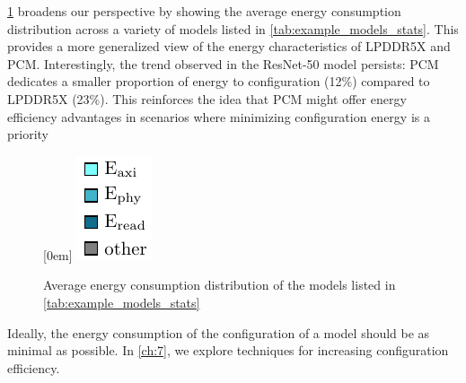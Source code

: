 
\cref{fig:example_models_avg_conf_proc} broadens our perspective by showing the average energy consumption distribution across a variety of models listed in \cref{tab:example_models_stats}.
This provides a more generalized view of the energy characteristics of LPDDR5X and PCM.
Interestingly, the trend observed in the ResNet-50 model persists: PCM dedicates a smaller proportion of energy to configuration (12\%) compared to LPDDR5X (23\%).
This reinforces the idea that PCM might offer energy efficiency advantages in scenarios where minimizing configuration energy is a priority

\begin{figure}[hbtp]
    \centering
    \hfill
    \subcaptionbox*{}[0em]{
        \includegraphics{assets/legend.pdf}
    }
    \hfill
    \caption{Average energy consumption distribution of the models listed in \cref{tab:example_models_stats}}
    \label{fig:example_models_avg_conf_proc}
\end{figure}

Ideally, the energy consumption of the configuration of a model should be as minimal as possible.
In \cref{ch:7}, we explore techniques for increasing configuration efficiency.

